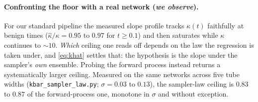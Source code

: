 \documentclass[11pt]{article}
\theoremstyle{remark}
\begin{document}
\paragraph{Confronting the floor with a real network (\emph{we observe}).} For our
standard pipeline the measured slope profile tracks $\kappa(t)$ faithfully at benign
times ($\hat\kappa/\kappa=0.95$ to $0.97$ for $t\ge0.1$) and then saturates while
$\kappa$ continues to $\sim\!10$. \emph{Which} ceiling one reads off depends on the law
the regression is taken under, and \eqref{eq:khat} settles that: the hypothesis is the
slope under the sampler's \emph{own} ensemble. Probing the forward process instead
returns a systematically larger ceiling. Measured on the same networks across five tube
widths (\texttt{kbar\_sampler\_law.py}; $\sigma=0.03$ to $0.13$), the sampler-law ceiling
is $0.83$ to $0.87$ of the forward-process one, monotone in $\sigma$ and without
exception.
\end{document}
